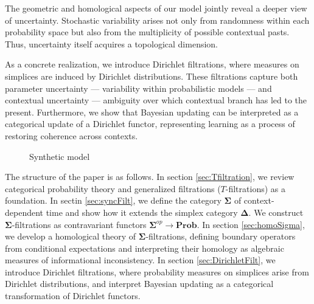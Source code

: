 \documentclass[12pt, a4paper]{amsart}
\theoremstyle{plain}
\theoremstyle{definition}
\numberwithin{figure}{section}
\numberwithin{table}{section}
\numberwithin{equation}{section}
\newcommand{\Prob}{\mathbf{Prob}}
\newcommand{\bDelta}{\mathbf{\Delta}}
\newcommand{\bSigma}{\mathbf{\Sigma}}
\begin{document}
The geometric and homological aspects of our model 
jointly reveal a deeper view of uncertainty. 
Stochastic variability arises not only from randomness within each probability space 
but also from the multiplicity of possible contextual pasts. 
Thus, 
uncertainty itself acquires a topological dimension.

As a concrete realization, 
we introduce Dirichlet filtrations, 
where measures on simplices are induced by Dirichlet distributions. 
These filtrations capture both parameter uncertainty
— variability within probabilistic models —
and contextual uncertainty
— ambiguity over which contextual branch has led to the present. 
Furthermore, 
we show that Bayesian updating can be interpreted as a categorical 
update of a Dirichlet functor, 
representing learning as a process of restoring coherence across contexts.

\begin{figure}

\label{fig:syntheticModel}
\caption{Synthetic model}
\end{figure}



The structure of the paper is as follows.
In section \ref{sec:Tfiltration},
we review categorical probability theory and 
generalized filtrations ($T$-filtrations) as a foundation.
In sectin \ref{sec:syncFilt},
we define the category $\bSigma$ of context-dependent time
and show how it extends the simplex category $\bDelta$.
We construct $\bSigma$-filtrations as contravariant functors 
$\bSigma^{op} \to \Prob$.
In section \ref{sec:homoSigma},
we develop a homological theory of $\bSigma$-filtrations, 
defining boundary operators from conditional expectations 
and interpreting their homology as algebraic measures of informational inconsistency.
In section \ref{sec:DirichletFilt},
we introduce Dirichlet filtrations, 
where probability measures on simplices arise from Dirichlet distributions, 
and interpret Bayesian updating as a categorical transformation of Dirichlet functors.
\end{document}

